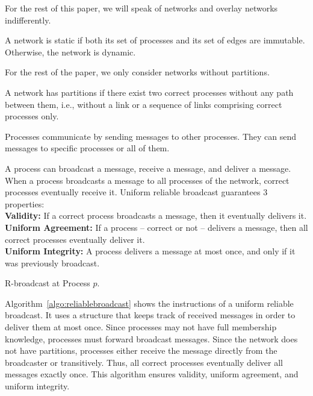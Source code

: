 For the rest of this paper, we will speak of networks and overlay networks
indifferently.

\begin{definition}
  A network is static if both its set of processes and its set of edges are
  immutable. Otherwise, the network is dynamic.
\end{definition}

For the rest of the paper, we only consider networks without partitions.

\begin{definition}
  A network has partitions if there exist two correct processes without any path
  between them, i.e., without a link or a sequence of links comprising correct
  processes only.
\end{definition}


Processes communicate by sending messages to other processes. They can send
messages to specific processes or all of them.

\begin{definition}
  A process can broadcast a message, receive a message, and deliver a message.
  When a process broadcasts a message to all processes of the network, correct
  processes eventually receive it. 
  Uniform reliable broadcast guarantees 3 properties: \\
  \textbf{Validity:} If a correct process broadcasts a message, then it
  eventually delivers it. \\
  \textbf{Uniform Agreement:} If a process -- correct or not -- delivers a
  message, then all correct processes eventually deliver it. \\
  \textbf{Uniform Integrity:} A process delivers a message at most once, and
  only if it was previously broadcast.
\end{definition}

\begin{algorithm}[h]
  
  \caption{\label{algo:reliablebroadcast}R-broadcast at Process $p$.}
\end{algorithm}

Algorithm~\ref{algo:reliablebroadcast} shows the instructions of a uniform
reliable broadcast. It uses a structure that keeps track of received messages in
order to deliver them at most once. 
Since processes may not have full membership knowledge, processes must forward
broadcast messages. Since the network does not have partitions, processes either
receive the message directly from the broadcaster or transitively. Thus, all
correct processes eventually deliver all messages exactly once. This algorithm
ensures validity, uniform agreement, and uniform integrity.

